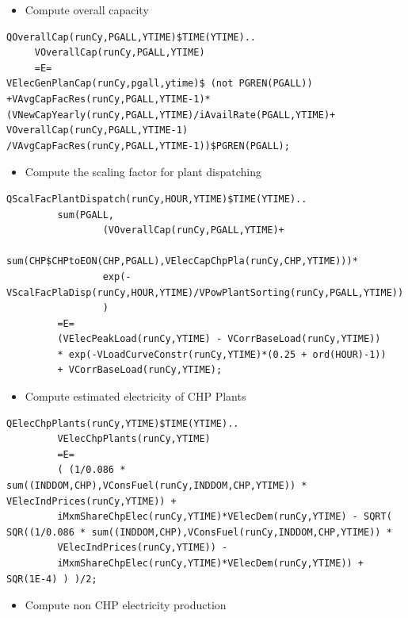 \documentclass[a4paper,]{scrartcl}
\providecommand{\tightlist}{%
  \setlength{\itemsep}{0pt}\setlength{\parskip}{0pt}}
\begin{document}
\begin{itemize}
\tightlist
\item
  Compute overall capacity
\end{itemize}

\begin{lstlisting}
QOverallCap(runCy,PGALL,YTIME)$TIME(YTIME)..
     VOverallCap(runCy,PGALL,YTIME)
     =E=
VElecGenPlanCap(runCy,pgall,ytime)$ (not PGREN(PGALL))
+VAvgCapFacRes(runCy,PGALL,YTIME-1)*(VNewCapYearly(runCy,PGALL,YTIME)/iAvailRate(PGALL,YTIME)+
VOverallCap(runCy,PGALL,YTIME-1)
/VAvgCapFacRes(runCy,PGALL,YTIME-1))$PGREN(PGALL);
\end{lstlisting}

\begin{itemize}
\tightlist
\item
  Compute the scaling factor for plant dispatching
\end{itemize}

\begin{lstlisting}
QScalFacPlantDispatch(runCy,HOUR,YTIME)$TIME(YTIME)..
         sum(PGALL,
                 (VOverallCap(runCy,PGALL,YTIME)+
                 sum(CHP$CHPtoEON(CHP,PGALL),VElecCapChpPla(runCy,CHP,YTIME)))*
                 exp(-VScalFacPlaDisp(runCy,HOUR,YTIME)/VPowPlantSorting(runCy,PGALL,YTIME))
                 )
         =E=
         (VElecPeakLoad(runCy,YTIME) - VCorrBaseLoad(runCy,YTIME))
         * exp(-VLoadCurveConstr(runCy,YTIME)*(0.25 + ord(HOUR)-1))
         + VCorrBaseLoad(runCy,YTIME);
\end{lstlisting}

\begin{itemize}
\tightlist
\item
  Compute estimated electricity of CHP Plants
\end{itemize}

\begin{lstlisting}
QElecChpPlants(runCy,YTIME)$TIME(YTIME)..
         VElecChpPlants(runCy,YTIME) 
         =E=
         ( (1/0.086 * sum((INDDOM,CHP),VConsFuel(runCy,INDDOM,CHP,YTIME)) * VElecIndPrices(runCy,YTIME)) + 
         iMxmShareChpElec(runCy,YTIME)*VElecDem(runCy,YTIME) - SQRT( SQR((1/0.086 * sum((INDDOM,CHP),VConsFuel(runCy,INDDOM,CHP,YTIME)) * 
         VElecIndPrices(runCy,YTIME)) - 
         iMxmShareChpElec(runCy,YTIME)*VElecDem(runCy,YTIME)) + SQR(1E-4) ) )/2;
\end{lstlisting}

\begin{itemize}
\tightlist
\item
  Compute non CHP electricity production
\end{itemize}
\end{document}

